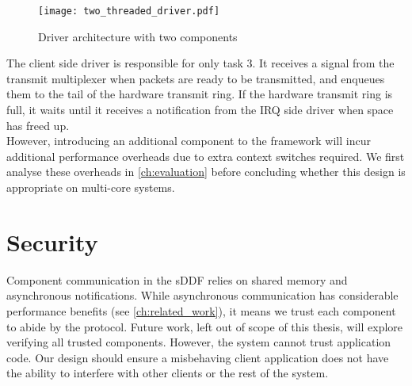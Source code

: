 \begin{figure}[h]
    \centering
    \texttt{[image: two\_threaded\_driver.pdf]}
    \caption{Driver architecture with two components}
    \label{f:two_threaded_driver}
\end{figure}

The client side driver is responsible for only task 3. It receives a signal from the transmit multiplexer when packets are ready
to be transmitted, and enqueues them to the tail of the hardware transmit ring. If the hardware transmit ring is full, it waits 
until it receives a notification from the IRQ side driver when space has freed up.\\
However, introducing an additional component to the framework will incur additional performance overheads due to extra context switches required.
We first analyse these overheads in \autoref{ch:evaluation} before concluding whether this design is appropriate on multi-core systems. 

\section{Security}\label{s:security}
Component communication in the sDDF relies on shared memory and asynchronous notifications. While asynchronous communication
has considerable performance benefits (see \autoref{ch:related_work}), it means we trust each component to abide by the protocol. 
Future work, left out of scope of this thesis, will explore verifying all trusted components. However, the system cannot
trust application code. Our design should ensure a 
misbehaving client application does not have the ability to interfere with other clients or the rest of the system.\\

